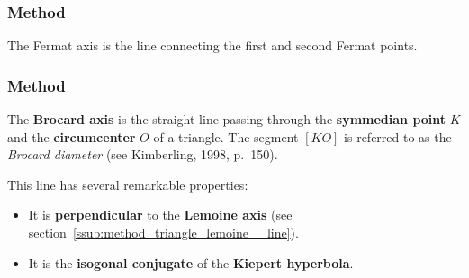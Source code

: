 \subsubsection{Method } %
\label{ssub:method_triangle_fermat__axis}

The Fermat axis is the  line connecting the first and second Fermat points.

\begin{minipage}{.5\textwidth}
    \begin{center}
    \end{center}
\end{minipage}
\begin{minipage}{.5\textwidth}
\begin{tkzexample}
\end{tkzexample}
\end{minipage}

\subsubsection{Method } %
\label{ssub:method_triangle_brocard__axis}

The \textbf{Brocard axis} is the straight line passing through the \textbf{symmedian point} $K$ and the \textbf{circumcenter} $O$ of a triangle. The segment $[KO]$ is referred to as the \emph{Brocard diameter} (see Kimberling, 1998, p.~150).

\medskip
\noindent
This line has several remarkable properties:
\begin{itemize}
  \item It is \textbf{perpendicular} to the \textbf{Lemoine axis} (see section~\ref{ssub:method_triangle_lemoine__line}).
  \item It is the \textbf{isogonal conjugate} of the \textbf{Kiepert hyperbola}.
\end{itemize}

